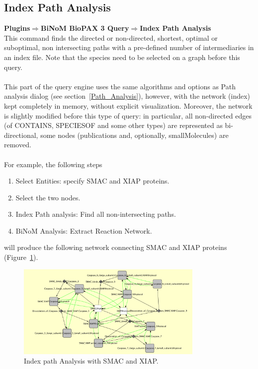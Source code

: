 \parbox{\textwidth}{

\subsection{Index Path Analysis}

\textbf{Plugins$\Rightarrow$BiNoM BioPAX 3 Query$\Rightarrow$Index Path Analysis}\\

This command finds the directed or non-directed, shortest, optimal or
suboptimal, non intersecting paths with a pre-defined number of intermediaries
in an index file. Note that the species need to be selected on a graph before
this query.\\\\
This part of the query engine uses the same algorithms and options as Path
analysis dialog (see section~\ref{Path_Analysis}), however, with the network
(index) kept completely in memory, without explicit visualization. Moreover, the
network is slightly modified before this type of query: in particular, all
non-directed edges (of CONTAINS, SPECIESOF and some other types) are represented
as bi-directional, some nodes (publications and, optionally, smallMolecules) are
removed.\\\\
For example, the following steps

\begin{enumerate}
\item Select Entities: specify SMAC and XIAP proteins.
\item Select the two nodes.
\item Index Path analysis: Find all non-intersecting paths.
\item BiNoM Analysis: Extract Reaction Network.
\end{enumerate}

will produce the following network connecting SMAC and XIAP proteins (Figure~\ref{Index_Path_Analysis}).

}

\begin{figure}
\centering
\includegraphics[width=0.8\textwidth]{graphics/ebo_index_path}
\caption{Index path Analysis with SMAC and XIAP.}
\label{Index_Path_Analysis}
\end{figure}

